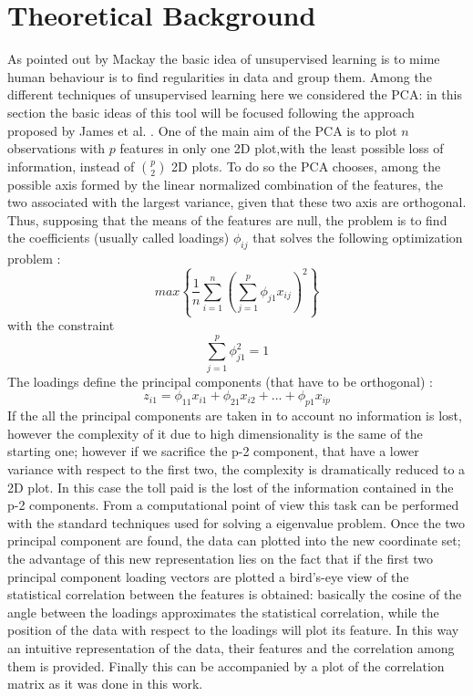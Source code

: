 \documentclass[
12pt, %
a4paper, %
oneside, %
headinclude,footinclude, %
BCOR5mm, %
]{scrartcl}
\begin{document}
\section{Theoretical Background} \label{Theoretical Background}
As pointed out by Mackay \cite{mackay2003information} the basic idea of unsupervised learning is to mime human behaviour is to find regularities in data and group them. Among the different techniques of unsupervised learning \cite{james2013introduction} here we considered the PCA: in this section the basic ideas of this tool will be focused following the approach proposed by James et al. \cite{james2013introduction}. One of the main aim of the PCA is to plot $n$ observations with $p$ features in only one 2D plot,with the least possible loss of information, instead of $\binom{p}{2}$ 2D plots. To do so the PCA chooses, among the possible axis formed by the linear normalized combination of the features, the two associated with the largest variance, given that these two axis are orthogonal. Thus, supposing that the means of the features are null, the problem is to find the coefficients (usually called loadings) $\phi_{ij}$ that solves the following optimization problem  \cite{james2013introduction}:
\begin{equation}
max\left\lbrace \dfrac{1}{n} \sum_{i=1}^{n} \left(\sum^{p} _{j=1} \phi_{j1}x_{ij} \right)^{2}   \right\rbrace
\end{equation}
with the constraint  \cite{james2013introduction}
\begin{equation}
\sum_{j=1}^{p}\phi_{j1}^{2}=1
\end{equation}
The loadings define the principal components (that have to be orthogonal)  \cite{james2013introduction}: 
\begin{equation}
z_{i1}=\phi_{11}x_{i1}+\phi_{21}x_{i2}+...+\phi_{p1}x_{ip}
\end{equation}
If the all the principal components are taken in to account no information is lost, however the complexity of it due to high dimensionality is the same of the starting one; however if we sacrifice the p-2 component, that have a lower variance with respect to the first two, the complexity is dramatically reduced to a 2D plot. In this case the toll paid is the lost of the information contained in the p-2 components. From a computational point of view this task can be performed with the standard techniques used for solving a eigenvalue problem. Once the two principal component are found, the data can plotted into the new coordinate set; the advantage of this new representation lies on the fact that if the first two principal component loading vectors are plotted a bird's-eye view of the statistical correlation between the features is obtained: basically the cosine of the angle between the loadings approximates the statistical correlation, while the position of the data with respect to the loadings will plot its feature. In this way an intuitive representation of the data, their features and the correlation among them is provided. Finally this can be accompanied by a plot of the correlation matrix as it was done in this work. 
\end{document}
